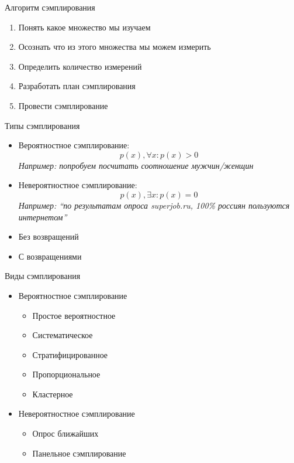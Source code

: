 \documentclass[14pt, fleqn, xcolor={dvipsnames, table}]{beamer}
\begin{document}
\begin{frame}{Алгоритм сэмплирования}
\begin{enumerate}
   \item Понять какое множество мы изучаем
   \item Осознать что из этого множества мы можем измерить
   \item Определить количество измерений
   \item Разработать план сэмплирования
   \item Провести сэмплирование
\end{enumerate}
\end{frame}

\begin{frame}{Типы сэмплирования}
\begin{itemize}
   \item Вероятностное сэмплирование: 
   $$
   p(x),\forall x:p(x) > 0
   $$
   \textit{Например: попробуем посчитать соотношение мужчин/женщин}
   \item Невероятностное сэмплирование:
   $$
   p(x), \exists x: p(x) = 0
   $$
   \textit{Например: ``по результатам опроса superjob.ru, 100\% россиян пользуются интернетом''}
   \item Без возвращений
   \item С возвращениями
\end{itemize}
\end{frame}

\begin{frame}{Виды сэмплирования}
\begin{itemize}
   \item Вероятностное сэмплирование
   \begin{itemize}
    \item Простое вероятностное
    \item Систематическое
    \item Стратифицированное
    \item Пропорциональное
    \item Кластерное
   \end{itemize}
   \item Невероятностное сэмплирование
   \begin{itemize}
    \item Опрос ближайших
    \item Панельное сэмплирование
   \end{itemize}
\end{itemize}
\end{frame}
\end{document}
